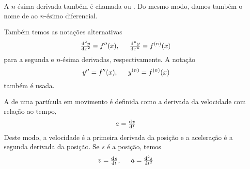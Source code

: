 A $n$-ésima derivada também é chamada  ou . Do mesmo modo, damos também o nome de
 ao
$n$-ésimo diferencial.

Também temos as notações alternativas
$$
  \od[2]{y}{x} = f''(x), \hspace{1.5em}
  \od[n]{y}{x} = f^{(n)}(x)
$$
para a segunda e $n$-ésima derivadas, respectivamente. A notação
$$
  y'' = f''(x), \hspace{1.5em} y^{(n)} = f^{(n)}(x)
$$
também é usada.

%
%

A  de uma partícula em movimento é definida como a derivada
da velocidade com relação ao tempo,
$$
  a = \od v t
$$
Deste modo, a velocidade é a primeira derivada da posição e a aceleração
é a segunda derivada da posição. Se $s$ é a posição, temos
$$
  v = \od s t, \hspace{1.5em} a = \od[2] s t
$$

